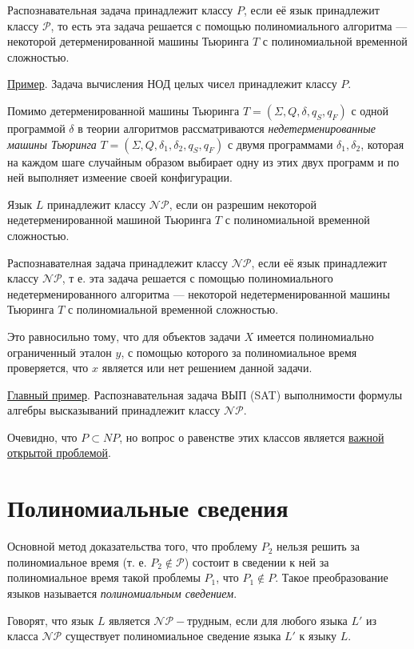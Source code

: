 \dftion Распознавательная задача принадлежит классу $P$, если её язык принадлежит классу $\mathscr{P}$, то есть эта задача решается с помощью полиномиального алгоритма --- некоторой детерменированной машины Тьюринга $T$ с полиномиальной временной сложностью.

\underline{Пример}. Задача вычисления НОД целых чисел принадлежит классу $P$.

Помимо детерменированной машины Тьюринга $T=(\Sigma, Q, \delta, q_S, q_F)$ с одной программой $\delta$ в теории алгоритмов рассматриваются \textit{недетерменированные машины Тьюринга} $T=(\Sigma, Q, \delta_1, \delta_2, q_S, q_F)$ с двумя программами $\delta_1, \delta_2$, которая на каждом шаге случайным образом выбирает одну из этих двух программ и по ней выполняет измеение своей конфигурации.

\dftion Язык $L$ принадлежит классу $\mathscr{NP}$, если он разрешим некоторой недетерменированной машиной Тьюринга $T$ с полиномиальной временной сложностью.

\dftion Распознавателная задача принадлежит классу $\mathscr{NP}$, если её язык принадлежит классу $\mathscr{NP}$, т е. эта задача решается с помощью полиномиального недетерменированного алгоритма --- некоторой недетерменированной машины Тьюринга $T$ с полиномиальной временной сложностью.

Это равносильно тому, что для объектов задачи $X$ имеется полиномиально ограниченный эталон $y$, с помощью которого за полиномиальное время проверяется, что $x$ является или нет решением данной задачи.

\underline{Главный пример}. Распознавательная задача ВЫП (SAT) выполнимости формулы алгебры высказываний принадлежит классу $\mathscr{NP}$.

Очевидно, что $P \subset NP$, но вопрос о равенстве этих классов является \underline{важной открытой проблемой}.

\section{Полиномиальные сведения}
Основной метод доказательства того, что проблему $P_2$ нельзя решить за полиномиальное время (т. е. $P_2 \not\in \mathscr{P}$) состоит в сведении к ней за полиномиальное время такой проблемы $P_1$, что $P_1 \not\in P$. Такое преобразование языков называется \textit{полиномиальным сведением}.

\dftion Говорят, что язык $L$ является $\mathscr{NP}-\text{трудным}$, если для любого языка $L'$ из класса $\mathscr{NP}$ существует полиномиальное сведение языка $L'$ к языку $L$.

